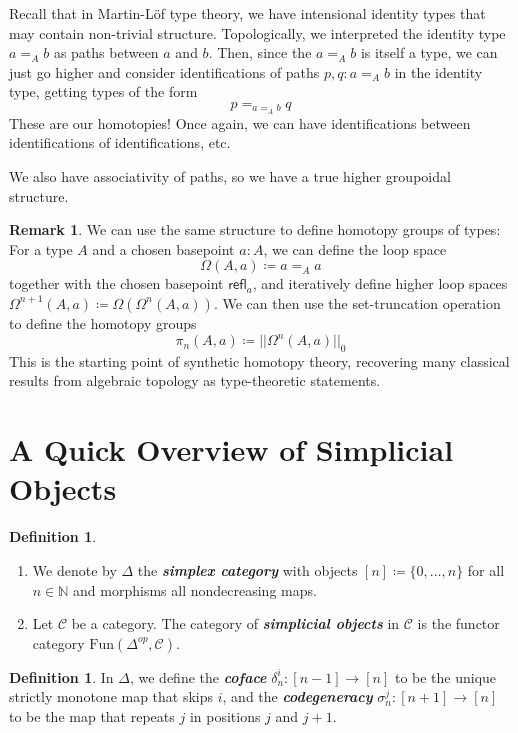 \documentclass{article}
\newcommand{\textbi}[1]{\textbf{\textit{#1}}}
\newcommand{\C}{\mathscr{C}}
\newcommand{\bN}{\mathbb{N}}
\newcommand{\Fun}{\mathrm{Fun}}
\theoremstyle{definition}
\newtheorem{defin}[subsection]{Definition}
\newtheorem{rem}[subsection]{Remark}
\begin{document}
Recall that in Martin-L\"of type theory, we have intensional identity types that may contain non-trivial structure. Topologically, we interpreted the identity type $a=_A b$ as paths between $a$ and $b$. Then, since the $a=_A b$ is itself a type, we can just go higher and consider identifications of paths $p,q:a=_A b$ in the identity type, getting types of the form $$p=_{a=_A b}q$$ These are our homotopies! Once again, we can have identifications between identifications of identifications, etc. 
\par We also have associativity of paths, so we have a true higher groupoidal structure.
\begin{rem}
    We can use the same structure to define homotopy groups of types: For a type $A$ and a chosen basepoint $a:A$, we can define the loop space $$\Omega(A,a)\coloneqq a=_Aa$$ together with the chosen basepoint $\mathsf{refl}_a$, and iteratively define higher loop spaces $\Omega^{n+1}(A,a)\coloneqq \Omega(\Omega^n(A,a))$. We can then use the set-truncation operation to define the homotopy groups $$\pi_n(A,a)\coloneqq ||\Omega^n(A,a)||_0$$
    This is the starting point of synthetic homotopy theory, recovering many classical results from algebraic topology as type-theoretic statements.
\end{rem}

\section{A Quick Overview of Simplicial Objects}

\begin{defin} \
    \begin{enumerate}
        \item We denote by $\Delta$ the \textbi{simplex category} with objects $[n]\coloneqq \{0,\dots,n\}$ for all $n\in\bN$ and morphisms all nondecreasing maps.
        \item Let $\C$ be a category. The category of \textbi{simplicial objects} in $\C$ is the functor category $\Fun(\Delta^{op}, \C)$.
    \end{enumerate}
\end{defin}

\begin{defin}
    In $\Delta$, we define the \textbi{coface} $\delta_n^i: [n-1]\to [n]$ to be the unique strictly monotone map that skips $i$, and the \textbi{codegeneracy} $\sigma_n^j: [n+1]\to [n]$ to be the map that repeats $j$ in positions $j$ and $j+1$.   
\end{defin}
\end{document}

